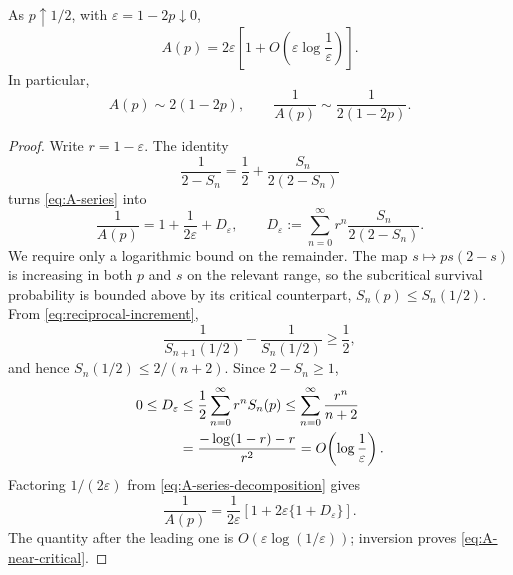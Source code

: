 \begin{theorem}
\label{thm:A-near-critical}
As \(p\uparrow1/2\), with \(\varepsilon=1-2p\downarrow0\),
\begin{equation}
  A(p)=2\varepsilon
  \left[1+O\!\left(\varepsilon\log\frac1\varepsilon\right)\right].
  \label{eq:A-near-critical}
\end{equation}
In particular,
\begin{equation}
  A(p)\sim2(1-2p),
  \qquad
  \frac{1}{A(p)}\sim\frac{1}{2(1-2p)}.
  \label{eq:A-leading-asymptotic}
\end{equation}
\end{theorem}

\begin{proof}
Write \(r=1-\varepsilon\).  The identity
\begin{equation}
  \frac{1}{2-S_n}=\frac12+\frac{S_n}{2(2-S_n)}
\end{equation}
turns \cref{eq:A-series} into
\begin{equation}
  \frac1{A(p)}
  =1+\frac1{2\varepsilon}+D_\varepsilon,
  \qquad
  D_\varepsilon
  :=\sum_{n=0}^{\infty}
     r^n\frac{S_n}{2(2-S_n)}.
  \label{eq:A-series-decomposition}
\end{equation}
We require only a logarithmic bound on the remainder.  The map
\(s\mapsto ps(2-s)\) is increasing in both \(p\) and \(s\) on the relevant range,
so the subcritical survival probability is bounded above by its critical counterpart,
\(S_n(p)\leq S_n(1/2)\).  From \cref{eq:reciprocal-increment},
\begin{equation}
  \frac1{S_{n+1}(1/2)}-\frac1{S_n(1/2)}\geq\frac12,
\end{equation}
and hence \(S_n(1/2)\leq2/(n+2)\).  Since \(2-S_n\geq1\),
\begin{align}
  0\leq D_\varepsilon
  &\leq\frac12\sum_{n=0}^{\infty}r^nS_n(p)
   \leq\sum_{n=0}^{\infty}\frac{r^n}{n+2}
  \notag\\
  &=\frac{-\log(1-r)-r}{r^2}
   =O\!\left(\log\frac1\varepsilon\right).
  \label{eq:D-epsilon-bound}
\end{align}
Factoring \(1/(2\varepsilon)\) from \cref{eq:A-series-decomposition} gives
\begin{equation}
  \frac1{A(p)}
  =\frac1{2\varepsilon}
   \left[1+2\varepsilon\{1+D_\varepsilon\}\right].
\end{equation}
The quantity after the leading one is
\(O(\varepsilon\log(1/\varepsilon))\); inversion proves
\cref{eq:A-near-critical}.
\end{proof}

